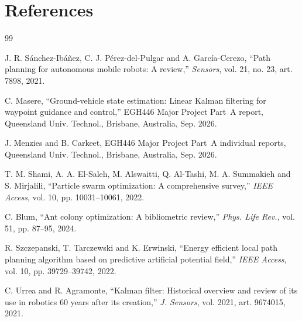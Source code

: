 \section*{References}

\begingroup
\renewcommand{\chapter}[2]{}
\begin{thebibliography}{99}

J. R. S\'{a}nchez-Ib\'{a}\~{n}ez, C. J. P\'{e}rez-del-Pulgar and A. Garc\'{i}a-Cerezo, ``Path planning for autonomous mobile robots: A review,'' \textit{Sensors}, vol. 21, no. 23, art. 7898, 2021.

C. Masere, ``Ground-vehicle state estimation: Linear Kalman filtering for waypoint guidance and control,'' EGH446 Major Project Part~A report, Queensland Univ. Technol., Brisbane, Australia, Sep. 2026.

J. Menzies and B. Carkeet, EGH446 Major Project Part~A individual reports, Queensland Univ. Technol., Brisbane, Australia, Sep. 2026.

T. M. Shami, A. A. El-Saleh, M. Alswaitti, Q. Al-Tashi, M. A. Summakieh and S. Mirjalili, ``Particle swarm optimization: A comprehensive survey,'' \textit{IEEE Access}, vol. 10, pp. 10031--10061, 2022.

C. Blum, ``Ant colony optimization: A bibliometric review,'' \textit{Phys. Life Rev.}, vol. 51, pp. 87--95, 2024.

R. Szczepanski, T. Tarczewski and K. Erwinski, ``Energy efficient local path planning algorithm based on predictive artificial potential field,'' \textit{IEEE Access}, vol. 10, pp. 39729--39742, 2022.

C. Urrea and R. Agramonte, ``Kalman filter: Historical overview and review of its use in robotics 60 years after its creation,'' \textit{J. Sensors}, vol. 2021, art. 9674015, 2021.

\end{thebibliography}
\endgroup

